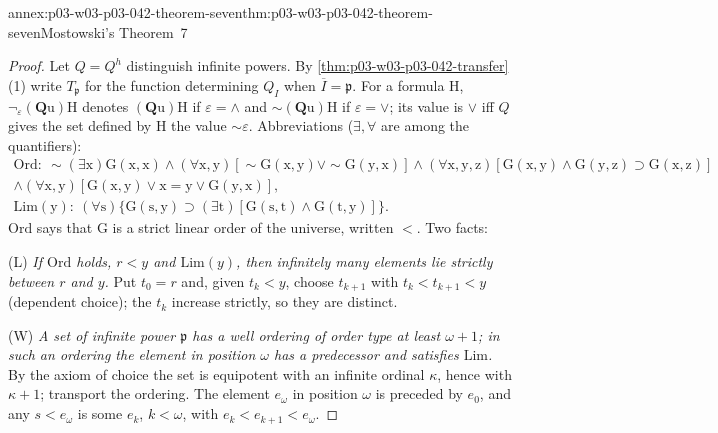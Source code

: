 \begin{annexitem}{annex:p03-w03-p03-042-theorem-seven}{thm:p03-w03-p03-042-theorem-seven}{Mostowski's Theorem~7}
\begin{proof}
Let \(Q=Q^h\) distinguish infinite powers.  By
\cref{thm:p03-w03-p03-042-transfer}(1) write \(T_{\mathfrak p}\) for the
function determining \(Q_I\) when \(\overline I=\mathfrak p\).  For a
formula \(\mathrm H\), \(\neg_\varepsilon(\mathbf Q\mathrm u)\mathrm H\)
denotes \((\mathbf Q\mathrm u)\mathrm H\) if \(\varepsilon=\wedge\) and
\({\sim}(\mathbf Q\mathrm u)\mathrm H\) if \(\varepsilon=\vee\); its value
is \(\vee\) iff \(Q\) gives the set defined by \(\mathrm H\) the value
\({\sim}\varepsilon\).  Abbreviations (\(\exists,\forall\) are among the
quantifiers):
\begin{gather*}
\mathrm{Ord}:\ {\sim}(\exists\mathrm x)\mathrm G(\mathrm x,\mathrm x)\wedge
(\forall\mathrm x,\mathrm y)[{\sim}\mathrm G(\mathrm x,\mathrm y)\vee
{\sim}\mathrm G(\mathrm y,\mathrm x)]\wedge(\forall\mathrm x,\mathrm y,
\mathrm z)[\mathrm G(\mathrm x,\mathrm y)\wedge\mathrm G(\mathrm y,\mathrm
z)\supset\mathrm G(\mathrm x,\mathrm z)]\\
\wedge(\forall\mathrm x,\mathrm y)[\mathrm G(\mathrm x,\mathrm y)\vee
\mathrm x=\mathrm y\vee\mathrm G(\mathrm y,\mathrm x)],\\
\mathrm{Lim}(\mathrm y):\ (\forall\mathrm s)\{\mathrm G(\mathrm s,\mathrm
y)\supset(\exists\mathrm t)[\mathrm G(\mathrm s,\mathrm t)\wedge\mathrm
G(\mathrm t,\mathrm y)]\}.
\end{gather*}
\(\mathrm{Ord}\) says that \(\mathrm G\) is a strict linear order of the
universe, written \(<\).  Two facts:

(L) \emph{If \(\mathrm{Ord}\) holds, \(r<y\) and \(\mathrm{Lim}(y)\), then
infinitely many elements lie strictly between \(r\) and \(y\).}  Put
\(t_0=r\) and, given \(t_k<y\), choose \(t_{k+1}\) with \(t_k<t_{k+1}<y\)
(dependent choice); the \(t_k\) increase strictly, so they are distinct.

(W) \emph{A set of infinite power \(\mathfrak p\) has a well ordering of
order type at least \(\omega+1\); in such an ordering the element in
position \(\omega\) has a predecessor and satisfies \(\mathrm{Lim}\).}  By
the axiom of choice the set is equipotent with an infinite ordinal
\(\kappa\), hence with \(\kappa+1\); transport the ordering.  The element
\(e_\omega\) in position \(\omega\) is preceded by \(e_0\), and any
\(s<e_\omega\) is some \(e_k\), \(k<\omega\), with \(e_k<e_{k+1}<e_\omega\).


\end{proof}
\end{annexitem}
